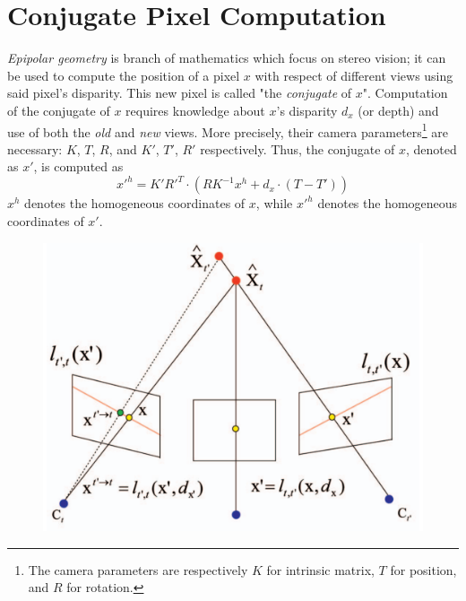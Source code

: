 \documentclass[notitlepage,english]{hgbreport}
\begin{document}
\section{Conjugate Pixel Computation}\label{app:conjugate_pixel}
\emph{Epipolar geometry} is branch of mathematics which focus on stereo vision; it can be used to compute the position of a pixel $x$ with respect of different views using said pixel's disparity. This new pixel is called "the \emph{conjugate} of $x$".
Computation of the conjugate of $x$ requires knowledge about $x$'s disparity $d_x$ (or depth) and use of both the \emph{old} and \emph{new} views.
More precisely, their camera parameters\footnote{The camera parameters are respectively $K$ for intrinsic matrix, $T$ for position, and $R$ for rotation.} are necessary: $K$, $T$, $R$,  and $K'$, $T'$, $R'$ respectively.
Thus, the conjugate of $x$, denoted as $x'$, is computed as
$$x'^h = K'R'^T\cdot\left(RK^{-1}x^h + d_x\cdot\left( T - T' \right) \right)$$
$x^h$ denotes the homogeneous coordinates of $x$, while $x'^h$ denotes the homogeneous coordinates of $x'$.
\begin{figure}[!h]
	\centering
	\includegraphics[width=.75\textwidth]{conjugate_pixel.png} %
	\caption{}
\end{figure}

\MakeBibliography[nosplit]
\end{document}
